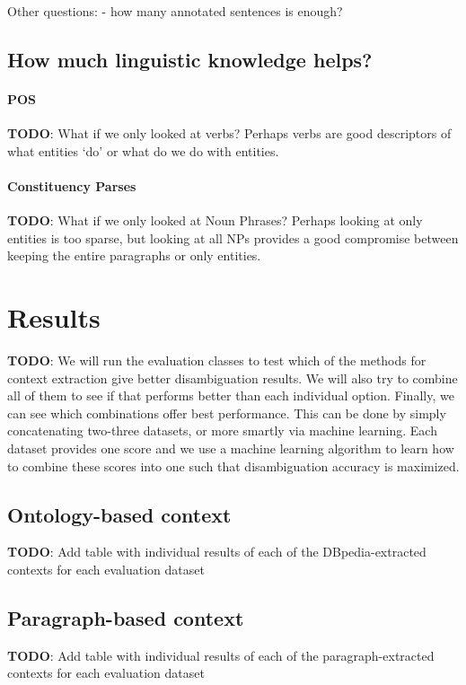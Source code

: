 \documentclass[10pt,a4paper]{article}
\newcommand{\todo}[1]{{\color{red}\textsf{\textbf{TODO}}: #1}}
\begin{document}
Other questions:
- how many annotated sentences is enough?

\subsection{How much linguistic knowledge helps?}

\paragraph{POS}
\todo{What if we only looked at verbs? Perhaps verbs are good descriptors of what entities `do' or what do we do with entities.}

\paragraph{Constituency Parses}
\todo{What if we only looked at Noun Phrases? Perhaps looking at only entities is too sparse, but looking at all NPs provides a good compromise between keeping the entire paragraphs or only entities.}

\section{Results}

\todo{We will run the evaluation classes to test which of the methods for context extraction give better disambiguation results. We will also try to combine all of them to see if that performs better than each individual option. Finally, we can see which combinations offer best performance. This can be done by simply concatenating two-three datasets, or more smartly via machine learning. Each dataset provides one score and we use a machine learning algorithm to learn how to combine these scores into one such that disambiguation accuracy is maximized.}

\subsection{Ontology-based context}

\todo{Add table with individual results of each of the DBpedia-extracted contexts for each evaluation dataset}

\subsection{Paragraph-based context}

\todo{Add table with individual results of each of the paragraph-extracted contexts for each evaluation dataset}
\end{document}
